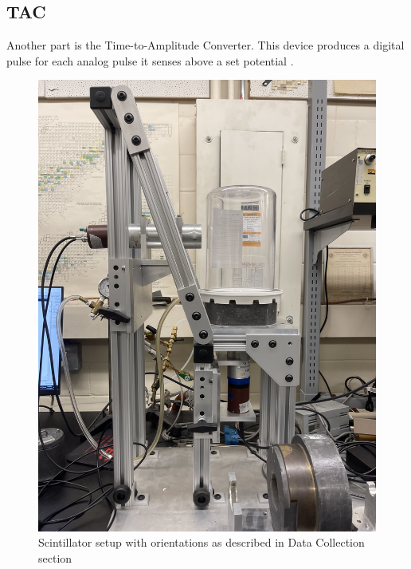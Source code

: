 \documentclass[10pt,letterpaper]{article}
\begin{document}
\subsection{TAC}
Another part is the Time-to-Amplitude Converter. This device produces a digital pulse for each analog pulse it senses above a set potential \cite{Zute:2018}.
\begin{figure}[!htbp]
    \begin{center}
        \includegraphics[width=5in, angle=270]{IMG_8886.JPG}
        \caption{Scintillator setup with orientations as described in Data Collection section}
    \end{center}
\end{figure}
\end{document}
